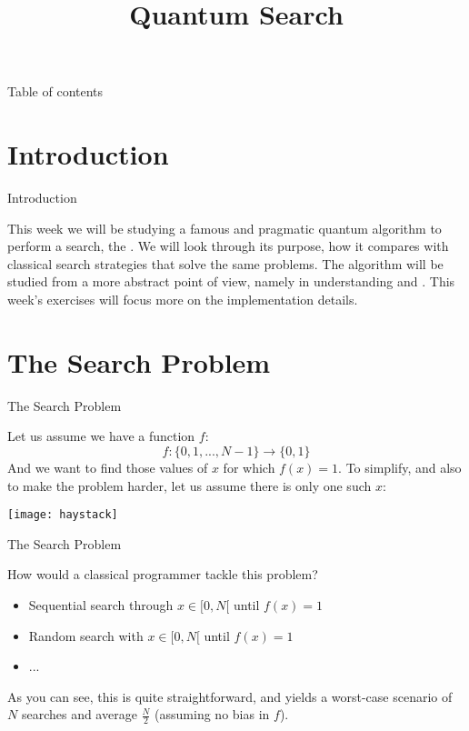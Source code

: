 \documentclass[aspectratio=43]{beamer}
\title{Quantum Search}
\begin{document}
\begin{frame}
	\titlepage
\end{frame}


\begin{frame}{Table of contents}
	\begin{card}
		\tableofcontents
	\end{card}
\end{frame}


\section{Introduction}
\begin{frame}{Introduction}
    \begin{card}
        This week we will be studying a famous and pragmatic quantum algorithm to perform a search, the \textbf{\gvsa}. We will look through its purpose, how it compares with classical search strategies that solve the same problems. The algorithm will be studied from a more abstract point of view, namely in understanding \textbf{\phiv} and \textbf{\iatm}. This week's exercises will focus more on the implementation details.
    \end{card}
\pagenumber
\end{frame}


\section{The Search Problem}
\begin{frame}{The Search Problem}
    \begin{cardTiny}
        Let us assume we have a function $f$:
        \begin{equation*}
            f : \{0, 1, ..., N-1\} \rightarrow \{0,1\}
        \end{equation*}
        And we want to find those values of $x$ for which $f(x)=1$. To simplify, and also to make the problem harder, let us assume there is only one such $x$:
    \begin{center}
        \texttt{[image: haystack]}
    \end{center}
    \end{cardTiny}
\pagenumber
\end{frame}

\begin{frame}{The Search Problem}
    \begin{card}
        How would a classical programmer tackle this problem?
        \begin{itemize}
            \item Sequential search through $x \in [0, N[$ until $f(x)=1$
            \item Random search with $x \in [0, N[$ until $f(x)=1$
            \item ...
        \end{itemize}
        As you can see, this is quite straightforward, and yields a worst-case scenario of $N$ searches and average $\frac{N}{2}$ (assuming no bias in $f$).
    \end{card}
\pagenumber
\end{frame}
\end{document}
